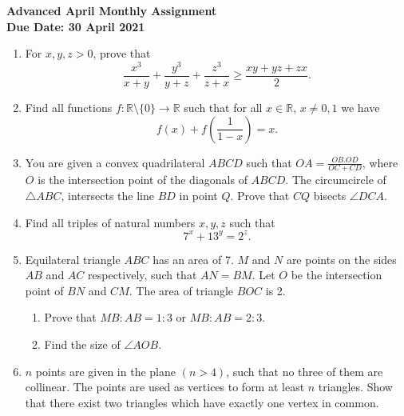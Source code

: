 \documentclass{article}
\begin{document}
\thispagestyle{empty}

\begin{center}
  \textbf{\Large Advanced April Monthly Assignment}
  \\ \vspace{1em}
  \textbf{\large Due Date: 30 April 2021}
\end{center}

\vspace{12pt}

\begin{enumerate}[itemsep=18pt]

\vspace{6pt}
\item %
For $x,y,z > 0$, prove that
\[ \frac{x^3}{x+y} +\frac{y^3}{y+z} +\frac{z^3}{z+x} \geq \frac{xy+yz+zx}{2}. \]


\item %
Find all functions $f:\mathbb{R}\setminus\{0\} \to \mathbb{R}$ such that for all $x \in \mathbb{R}$, $x \neq 0,1$ we have
\[ f(x) +f\left(\frac{1}{1-x}\right) = x. \]


\item %
You are given a convex quadrilateral $ABCD$ such that $OA = \frac{OB.OD}{OC+CD}$, where $O$ is the intersection point of the diagonals of $ABCD$.
The circumcircle of $\triangle ABC$, intersects the line $BD$ in point $Q$.
Prove that $CQ$ bisects $\angle DCA.$


\item %
Find all triples of natural numbers $x,y,z$ such that $$7^x +13^y = 2^z.$$


\item %
Equilateral triangle $ABC$ has an area of 7.
$M$ and $N$ are points on the sides $AB$ and $AC$ respectively, such that $AN = BM$.
Let $O$ be the intersection point of $BN$ and $CM$.
The area of triangle $BOC$ is 2.
\begin{enumerate}
	\item Prove that $MB:AB = 1:3$ or $MB:AB = 2:3$.
	\item Find the size of $\angle AOB$.
\end{enumerate}


\item %
$n$ points are given in the plane $(n > 4)$, such that no three of them are collinear.
The points are used as vertices to form at least $n$ triangles.
Show that there exist two triangles which have exactly one vertex in common.

\end{enumerate}
\end{document}
